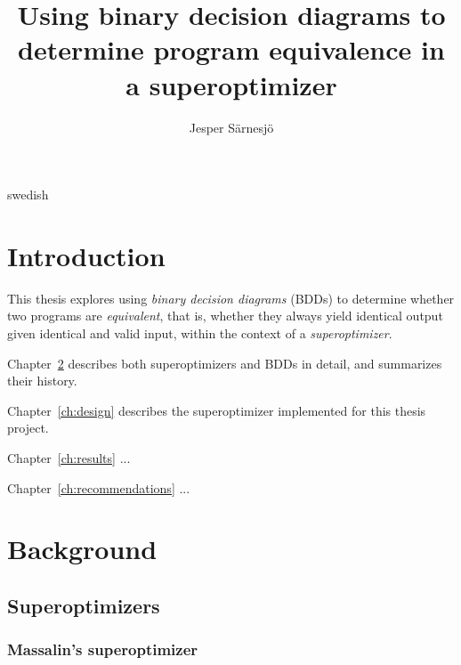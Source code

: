 \documentclass[a4paper,11pt]{kth-mag}
\title{Using binary decision diagrams to determine program equivalence in a superoptimizer}
\subtitle{}
\author{Jesper Särnesjö}
\date{}
\begin{document}
\frontmatter

\pagestyle{empty}

\removepagenumbers

\maketitle


\begin{abstract}
\end{abstract}

\clearpage

\begin{foreignabstract}{swedish}
\end{foreignabstract}

\clearpage

\tableofcontents*

\mainmatter

\pagestyle{newchap}

\chapter{Introduction}
\label{ch:introduction}

This thesis explores using \emph{binary decision diagrams} (BDDs) to determine whether two programs are \emph{equivalent}, that is, whether they always yield identical output given identical and valid input, within the context of a \emph{superoptimizer}.

Chapter~\ref{ch:background} describes both superoptimizers and BDDs in detail, and summarizes their history.

Chapter~\ref{ch:design} describes the superoptimizer implemented for this thesis project.

Chapter~\ref{ch:results} ...

Chapter~\ref{ch:recommendations} ...

\chapter{Background}
\label{ch:background}

\section{Superoptimizers}

\subsection{Massalin's superoptimizer}
\end{document}

